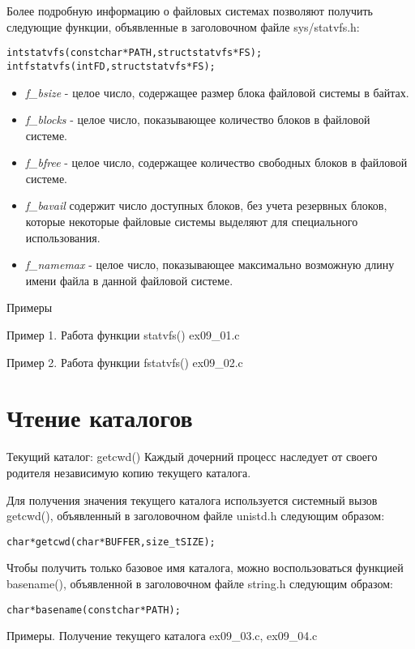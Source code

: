 \documentclass{beamer}
\begin{document}
\begin{frame}[fragile]
Более подробную информацию о файловых системах позволяют получить следующие функции, объявленные в заголовочном файле sys/statvfs.h:
\begin{alltt}
int statvfs (const char * PATH, struct statvfs * FS);
int fstatvfs (int FD, struct statvfs * FS);
\end{alltt}
\begin{itemize}
\item \textit{f\_bsize} - целое число, содержащее размер блока файловой системы в байтах.
\item \textit{f\_blocks} - целое число, показывающее количество блоков в файловой системе.
\item \textit{f\_bfree} - целое число, содержащее количество свободных блоков в файловой системе.
\item \textit{f\_bavail} содержит число доступных блоков, без учета резервных блоков, которые некоторые файловые системы выделяют для специального использования.
\item \textit{f\_namemax} - целое число, показывающее максимально возможную длину имени файла в данной файловой системе. 
\end{itemize}
\end{frame}

\begin{frame}[fragile]{Примеры}
\begin{block}{Пример 1. Работа функции statvfs()}
ex09\_01.c
\end{block}
\begin{block}{Пример 2. Работа функции fstatvfs()}
ex09\_02.c
\end{block}
\end{frame}

\section{Чтение каталогов}

\begin{frame}[fragile]{Текущий каталог: getcwd()}
Каждый дочерний процесс наследует от своего родителя независимую копию текущего каталога.

Для получения значения текущего каталога используется системный вызов getcwd(), объявленный в заголовочном файле unistd.h следующим образом:
\begin{alltt}
char * getcwd (char * BUFFER, size_t SIZE);
\end{alltt}
Чтобы получить только базовое имя каталога, можно воспользоваться функцией basename(), объявленной в заголовочном файле string.h следующим образом:
\begin{alltt}
char * basename (const char * PATH);
\end{alltt}
\begin{block}{Примеры. Получение текущего каталога}
ex09\_03.c, ex09\_04.c
\end{block}
\end{frame}
\end{document}
